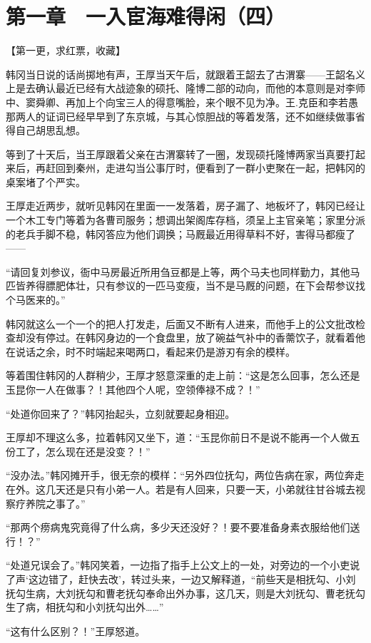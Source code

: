 \section{第一章　一入宦海难得闲（四）}

【第一更，求红票，收藏】

韩冈当日说的话尚掷地有声，王厚当天午后，就跟着王韶去了古渭寨——王韶名义上是去确认最近已经有大战迹象的硕托、隆博二部的动向，而他的本意则是对李师中、窦舜卿、再加上个向宝三人的得意嘴脸，来个眼不见为净。王.克臣和李若愚那两人的证词已经早早到了东京城，与其心惊胆战的等着发落，还不如继续做事省得自己胡思乱想。

等到了十天后，当王厚跟着父亲在古渭寨转了一圈，发现硕托隆博两家当真要打起来后，再赶回到秦州，走进勾当公事厅时，便看到了一群小吏聚在一起，把韩冈的桌案堵了个严实。

王厚走近两步，就听见韩冈在里面一一发落着，房子漏了、地板坏了，韩冈已经让一个木工专门等着为各曹司服务；想调出架阁库存档，须呈上主官亲笔；家里分派的老兵手脚不稳，韩冈答应为他们调换；马厩最近用得草料不好，害得马都瘦了——

“请回复刘参议，衙中马房最近所用刍豆都是上等，两个马夫也同样勤力，其他马匹皆养得膘肥体壮，只有参议的一匹马变瘦，当不是马厩的问题，在下会帮参议找个马医来的。”

韩冈就这么一个一个的把人打发走，后面又不断有人进来，而他手上的公文批改检查却没有停过。在韩冈身边的一个食盘里，放了碗益气补中的香薷饮子，就看着他在说话之余，时不时端起来喝两口，看起来仍是游刃有余的模样。

等着围住韩冈的人群稍少，王厚才怒意深重的走上前：“这是怎么回事，怎么还是玉昆你一人在做事？！其他四个人呢，空领俸禄不成？！”

“处道你回来了？”韩冈抬起头，立刻就要起身相迎。

王厚却不理这么多，拉着韩冈又坐下，道：“玉昆你前日不是说不能再一个人做五份工了，怎么现在还是没变？！”

“没办法。”韩冈摊开手，很无奈的模样：“另外四位抚勾，两位告病在家，两位奔走在外。这几天还是只有小弟一人。若是有人回来，只要一天，小弟就往甘谷城去视察疗养院之事了。”

“那两个痨病鬼究竟得了什么病，多少天还没好？！要不要准备身素衣服给他们送行！？”

“处道兄误会了。”韩冈笑着，一边指了指手上公文上的一处，对旁边的一个小吏说了声‘这边错了，赶快去改’，转过头来，一边又解释道，“前些天是相抚勾、小刘抚勾生病，大刘抚勾和曹老抚勾奉命出外办事，这几天，则是大刘抚勾、曹老抚勾生了病，相抚勾和小刘抚勾出外……”

“这有什么区别？！”王厚怒道。

